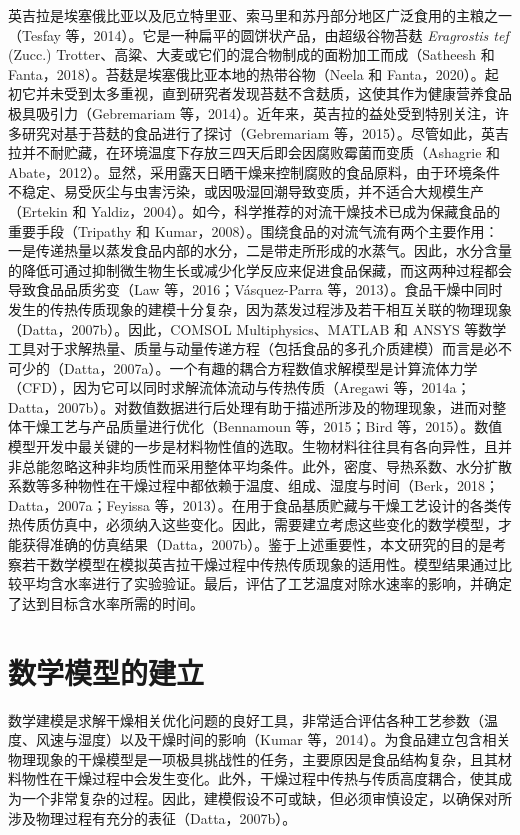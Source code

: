 \documentclass[11pt,a4paper]{ctexart}
\begin{document}
英吉拉是埃塞俄比亚以及厄立特里亚、索马里和苏丹部分地区广泛食用的主粮之一（Tesfay 等，2014）。它是一种扁平的圆饼状产品，由超级谷物苔麸 \textit{Eragrostis tef} (Zucc.) Trotter、高粱、大麦或它们的混合物制成的面粉加工而成（Satheesh 和 Fanta，2018）。苔麸是埃塞俄比亚本地的热带谷物（Neela 和 Fanta，2020）。起初它并未受到太多重视，直到研究者发现苔麸不含麸质，这使其作为健康营养食品极具吸引力（Gebremariam 等，2014）。近年来，英吉拉的益处受到特别关注，许多研究对基于苔麸的食品进行了探讨（Gebremariam 等，2015）。尽管如此，英吉拉并不耐贮藏，在环境温度下存放三四天后即会因腐败霉菌而变质（Ashagrie 和 Abate，2012）。显然，采用露天日晒干燥来控制腐败的食品原料，由于环境条件不稳定、易受灰尘与虫害污染，或因吸湿回潮导致变质，并不适合大规模生产（Ertekin 和 Yaldiz，2004）。如今，科学推荐的对流干燥技术已成为保藏食品的重要手段（Tripathy 和 Kumar，2008）。围绕食品的对流气流有两个主要作用：一是传递热量以蒸发食品内部的水分，二是带走所形成的水蒸气。因此，水分含量的降低可通过抑制微生物生长或减少化学反应来促进食品保藏，而这两种过程都会导致食品品质劣变（Law 等，2016；Vásquez-Parra 等，2013）。食品干燥中同时发生的传热传质现象的建模十分复杂，因为蒸发过程涉及若干相互关联的物理现象（Datta，2007b）。因此，COMSOL Multiphysics、MATLAB 和 ANSYS 等数学工具对于求解热量、质量与动量传递方程（包括食品的多孔介质建模）而言是必不可少的（Datta，2007a）。一个有趣的耦合方程数值求解模型是计算流体力学（CFD），因为它可以同时求解流体流动与传热传质（Aregawi 等，2014a；Datta，2007b）。对数值数据进行后处理有助于描述所涉及的物理现象，进而对整体干燥工艺与产品质量进行优化（Bennamoun 等，2015；Bird 等，2015）。数值模型开发中最关键的一步是材料物性值的选取。生物材料往往具有各向异性，且并非总能忽略这种非均质性而采用整体平均条件。此外，密度、导热系数、水分扩散系数等多种物性在干燥过程中都依赖于温度、组成、湿度与时间（Berk，2018；Datta，2007a；Feyissa 等，2013）。在用于食品基质贮藏与干燥工艺设计的各类传热传质仿真中，必须纳入这些变化。因此，需要建立考虑这些变化的数学模型，才能获得准确的仿真结果（Datta，2007b）。鉴于上述重要性，本文研究的目的是考察若干数学模型在模拟英吉拉干燥过程中传热传质现象的适用性。模型结果通过比较平均含水率进行了实验验证。最后，评估了工艺温度对除水速率的影响，并确定了达到目标含水率所需的时间。

\section{数学模型的建立}

数学建模是求解干燥相关优化问题的良好工具，非常适合评估各种工艺参数（温度、风速与湿度）以及干燥时间的影响（Kumar 等，2014）。为食品建立包含相关物理现象的干燥模型是一项极具挑战性的任务，主要原因是食品结构复杂，且其材料物性在干燥过程中会发生变化。此外，干燥过程中传热与传质高度耦合，使其成为一个非常复杂的过程。因此，建模假设不可或缺，但必须审慎设定，以确保对所涉及物理过程有充分的表征（Datta，2007b）。
\end{document}
